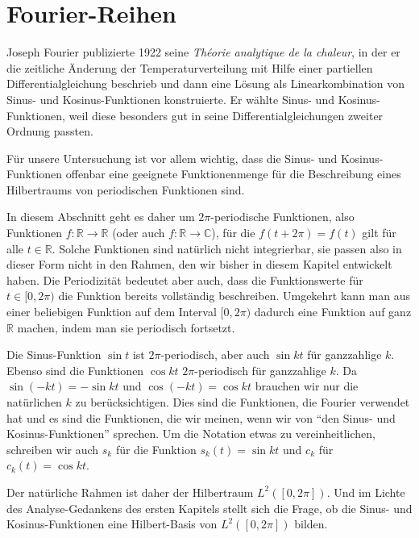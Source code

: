 %
%
%
\section{Fourier-Reihen
\label{section:fourier-reihen}}
Joseph Fourier publizierte 1922 seine {\em Théorie analytique de la chaleur},
in der er die zeitliche Änderung der Temperaturverteilung mit Hilfe einer
partiellen Differentialgleichung beschrieb und dann eine Lösung als
Linearkombination von Sinus- und Kosinus-Funktionen konstruierte. 
Er wählte Sinus- und Kosinus-Funktionen, weil diese besonders gut in
seine Differentialgleichungen zweiter Ordnung passten.

Für unsere Untersuchung ist vor allem wichtig, dass die Sinus- und
Kosinus-Funktionen offenbar eine geeignete Funktionenmenge für die
Beschreibung eines Hilbertraums von periodischen Funktionen sind.

In diesem Abschnitt geht es daher um $2\pi$-periodische Funktionen,
also Funktionen $f\colon \mathbb R\to \mathbb R$ (oder auch
$f\colon\mathbb R\to \mathbb C$),
für die $f(t+2\pi)= f(t)$ gilt für alle $t\in\mathbb R$.  
Solche Funktionen sind natürlich nicht integrierbar, sie passen also
in dieser Form nicht in den Rahmen, den wir bisher in diesem Kapitel
entwickelt haben.
Die Periodizität bedeutet aber auch, dass die Funktionswerte für
$t\in[0,2\pi)$ die Funktion bereits vollständig beschreiben.
Umgekehrt kann man aus einer beliebigen Funktion auf dem Interval
$[0,2\pi)$ dadurch eine Funktion auf ganz $\mathbb R$ machen, indem
man sie periodisch fortsetzt.

Die Sinus-Funktion $\sin t$ ist $2\pi$-periodisch, aber auch 
$\sin kt$ für ganzzahlige $k$.
Ebenso sind die Funktionen $\cos kt$ $2\pi$-periodisch für ganzzahlige $k$.
Da $\sin(-kt)=-\sin kt$ und $\cos(-kt)=\cos kt$ brauchen wir nur die
natürlichen $k$ zu berücksichtigen.
Dies sind die Funktionen, die Fourier verwendet hat und es sind die
Funktionen, die wir meinen, wenn wir von ``den Sinus- und Kosinus-Funktionen''
sprechen.
Um die Notation etwas zu vereinheitlichen, schreiben wir auch $s_k$ für
die Funktion $s_k(t)=\sin kt$ und $c_k$ für $c_k(t)=\cos kt$.

Der natürliche Rahmen ist daher der Hilbertraum $L^2([0,2\pi])$.
Und im Lichte des Analyse-Gedankens des ersten Kapitels stellt sich
die Frage, ob die Sinus- und Kosinus-Funktionen eine Hilbert-Basis
von $L^2([0,2\pi])$ bilden.

